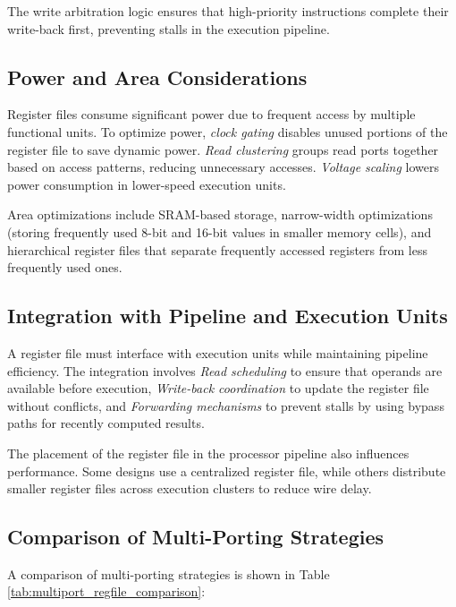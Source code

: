 The write arbitration logic ensures that high-priority instructions complete their write-back first, preventing stalls in the execution pipeline.

\subsection{Power and Area Considerations}
Register files consume significant power due to frequent access by multiple functional units. To optimize power, \textit{clock gating} disables unused portions of the register file to save dynamic power. \textit{Read clustering} groups read ports together based on access patterns, reducing unnecessary accesses. \textit{Voltage scaling} lowers power consumption in lower-speed execution units.

Area optimizations include SRAM-based storage, narrow-width optimizations (storing frequently used 8-bit and 16-bit values in smaller memory cells), and hierarchical register files that separate frequently accessed registers from less frequently used ones.

\subsection{Integration with Pipeline and Execution Units}
A register file must interface with execution units while maintaining pipeline efficiency. The integration involves \textit{Read scheduling} to ensure that operands are available before execution, \textit{Write-back coordination} to update the register file without conflicts, and \textit{Forwarding mechanisms} to prevent stalls by using bypass paths for recently computed results.

The placement of the register file in the processor pipeline also influences performance. Some designs use a centralized register file, while others distribute smaller register files across execution clusters to reduce wire delay.

\subsection{Comparison of Multi-Porting Strategies}
A comparison of multi-porting strategies is shown in Table \ref{tab:multiport_regfile_comparison}:

